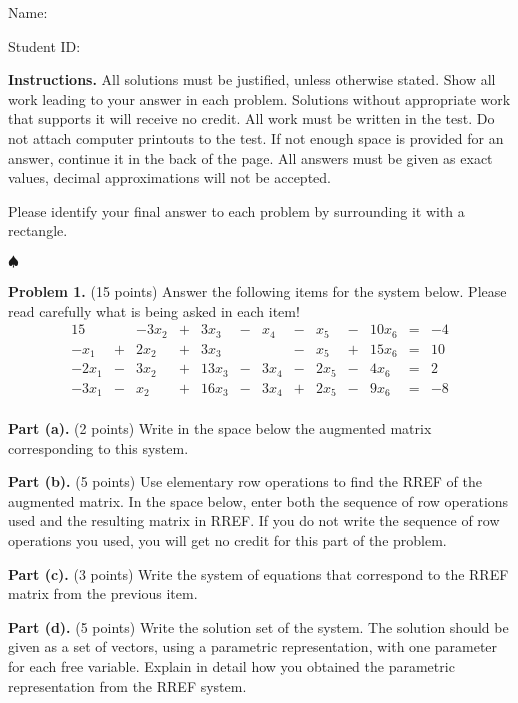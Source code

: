 \documentclass[12pt]{article}
\begin{document}
Name: \hrulefill

\bigskip
Student ID: \hrulefill

\bigskip
\textbf{Instructions.} All solutions must be justified, unless otherwise stated. Show all work leading to your answer in each problem. Solutions without appropriate work that supports it will receive no credit. All work must be written in the test. Do not attach computer printouts to the test. If not enough space is provided for an answer, continue it in the back of the page. All answers must be given as exact values, decimal approximations will not be accepted.

Please identify your final answer to each problem by surrounding it with a rectangle.

\vfill
\hfill$\spadesuit$

\clearpage

\textbf{Problem 1.} (15 points)
Answer the following items for the system below. Please read carefully what is being asked in each item!
\begin{alignat*}{15}
&{}{}&- 3 x_{2} &{}+{}& 3 x_{3} &{}-{}& x_{4} &{}-{}& x_{5} &{}-{}& 10 x_{6} &{}={}&-4\\ 
- x_{1} &{}+{}& 2 x_{2} &{}+{}& 3 x_{3}&{}{}& &{}-{}& x_{5} &{}+{}& 15 x_{6} &{}={}&10\\ 
- 2 x_{1} &{}-{}& 3 x_{2} &{}+{}& 13 x_{3} &{}-{}& 3 x_{4} &{}-{}& 2 x_{5} &{}-{}& 4 x_{6} &{}={}&2\\ 
- 3 x_{1} &{}-{}& x_{2} &{}+{}& 16 x_{3} &{}-{}& 3 x_{4} &{}+{}& 2 x_{5} &{}-{}& 9 x_{6} &{}={}&-8\\ 
\end{alignat*}

\textbf{Part (a).} (2 points) Write in the space below the augmented matrix corresponding to this system.

\vskip1.5in

\textbf{Part (b).} (5 points) Use elementary row operations to find the RREF of the augmented matrix. In the space below, enter both the sequence of row operations used and the resulting matrix in RREF. If you do not write the sequence of row operations you used, you will get no credit for this part of the problem.

\clearpage

\textbf{Part (c).} (3 points) Write the system of equations that correspond to the RREF matrix from the previous item.

\vskip2in

\textbf{Part (d).} (5 points) Write the solution set of the system. The solution should be given as a set of vectors, using a parametric representation, with one parameter for each free variable. Explain in detail how you obtained the parametric representation from the RREF system.
\end{document}
